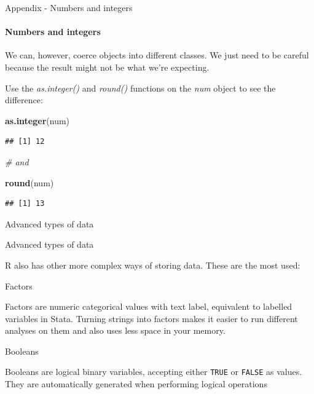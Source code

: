 \documentclass[ignorenonframetext,]{beamer}
\newenvironment{Shaded}{\begin{snugshade}}{\end{snugshade}}
\newcommand{\KeywordTok}[1]{\textcolor[rgb]{0.13,0.29,0.53}{\textbf{#1}}}
\newcommand{\CommentTok}[1]{\textcolor[rgb]{0.56,0.35,0.01}{\textit{#1}}}
\newcommand{\NormalTok}[1]{#1}
\begin{document}
\begin{frame}[fragile]{Appendix - Numbers and integers}

\framesubtitle{Numbers and integers}

We can, however, coerce objects into different classes. We just need to
be careful because the result might not be what we're expecting.

\begin{block}{Use the \emph{as.integer()} and \emph{round()} functions
on the \emph{num} object to see the difference:}

\begin{Shaded}
\begin{Highlighting}[]
\KeywordTok{as.integer}\NormalTok{(num)}
\end{Highlighting}
\end{Shaded}

\begin{verbatim}
## [1] 12
\end{verbatim}

\begin{Shaded}
\begin{Highlighting}[]
\CommentTok{# and}

\KeywordTok{round}\NormalTok{(num)}
\end{Highlighting}
\end{Shaded}

\begin{verbatim}
## [1] 13
\end{verbatim}

Advanced types of data

\end{block}

\end{frame}

\begin{frame}[fragile]{Advanced types of data}

R also has other more complex ways of storing data. These are the most
used:

\begin{block}{Factors}

Factors are numeric categorical values with text label, equivalent to
labelled variables in Stata. Turning strings into factors makes it
easier to run different analyses on them and also uses less space in
your memory.

\end{block}

\begin{block}{Booleans}

Booleans are logical binary variables, accepting either \texttt{TRUE} or
\texttt{FALSE} as values. They are automatically generated when
performing logical operations

\end{block}

\end{frame}
\end{document}
